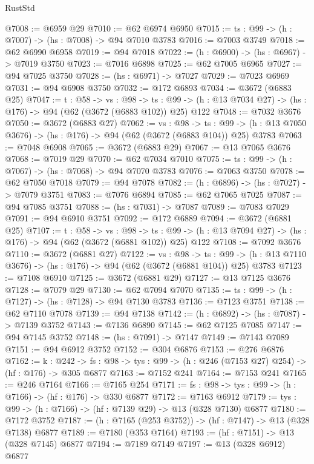 \begin{lexlean}{RustStd}
\begin{coremodule}
{\begin{coremodule}
{{{{{{{{{@7008 := @6959 @29
@7010 := @62 @6974 @6950
@7015 := {ts : @99} -> (h : @7007) -> (hs : @7008) -> @94 @7010 @3783
@7016 := @7003 @3749
@7018 := @62 @6990 @6958
@7019 := @94 @7018
@7022 := (h : @6900) -> (hs : @6967) -> @7019 @3750
@7023 := @7016 @6898
@7025 := @62 @7005 @6965
@7027 := @94 @7025 @3750
@7028 := (hs : @6971) -> @7027
@7029 := @7023 @6969
@7031 := @94 @6908 @3750
@7032 := @172 @6893
@7034 := @3672 (@6883 @25)
@7047 := {t : @58} ->
  {vs : @98} ->
  {ts : @99} -> (h : @13 @7034 @27) -> (hs : @176) -> @94 (@62 (@3672 (@6883 @102)) @25) @122
@7048 := @7032 @3676
@7050 := @3672 (@6883 @27)
@7062 := {vs : @98} ->
  {ts : @99} -> (h : @13 @7050 @3676) -> (hs : @176) -> @94 (@62 (@3672 (@6883 @104)) @25) @3783
@7063 := @7048 @6908
@7065 := @3672 (@6883 @29)
@7067 := @13 @7065 @3676
@7068 := @7019 @29
@7070 := @62 @7034 @7010
@7075 := {ts : @99} -> (h : @7067) -> (hs : @7068) -> @94 @7070 @3783
@7076 := @7063 @3750
@7078 := @62 @7050 @7018
@7079 := @94 @7078
@7082 := (h : @6896) -> (hs : @7027) -> @7079 @3751
@7083 := @7076 @6894
@7085 := @62 @7065 @7025
@7087 := @94 @7085 @3751
@7088 := (hs : @7031) -> @7087
@7089 := @7083 @7029
@7091 := @94 @6910 @3751
@7092 := @172 @6889
@7094 := @3672 (@6881 @25)
@7107 := {t : @58} ->
  {vs : @98} ->
  {ts : @99} -> (h : @13 @7094 @27) -> (hs : @176) -> @94 (@62 (@3672 (@6881 @102)) @25) @122
@7108 := @7092 @3676
@7110 := @3672 (@6881 @27)
@7122 := {vs : @98} ->
  {ts : @99} -> (h : @13 @7110 @3676) -> (hs : @176) -> @94 (@62 (@3672 (@6881 @104)) @25) @3783
@7123 := @7108 @6910
@7125 := @3672 (@6881 @29)
@7127 := @13 @7125 @3676
@7128 := @7079 @29
@7130 := @62 @7094 @7070
@7135 := {ts : @99} -> (h : @7127) -> (hs : @7128) -> @94 @7130 @3783
@7136 := @7123 @3751
@7138 := @62 @7110 @7078
@7139 := @94 @7138
@7142 := (h : @6892) -> (hs : @7087) -> @7139 @3752
@7143 := @7136 @6890
@7145 := @62 @7125 @7085
@7147 := @94 @7145 @3752
@7148 := (hs : @7091) -> @7147
@7149 := @7143 @7089
@7151 := @94 @6912 @3752
@7152 := @304 @6876
@7153 := @276 @6876
@7162 := {k : @242} ->
  {fs : @98} -> {tys : @99} -> (h : @246 (@7153 @27) @254) -> (hf : @176) -> @305 @6877
@7163 := @7152 @241
@7164 := @7153 @241
@7165 := @246 @7164
@7166 := @7165 @254
@7171 := {fs : @98} -> {tys : @99} -> (h : @7166) -> (hf : @176) -> @330 @6877
@7172 := @7163 @6912
@7179 := {tys : @99} -> (h : @7166) -> (hf : @7139 @29) -> @13 (@328 @7130) @6877
@7180 := @7172 @3752
@7187 := (h : @7165 (@253 @3752)) -> (hf : @7147) -> @13 (@328 @7138) @6877
@7189 := @7180 (@353 @7164)
@7193 := (hf : @7151) -> @13 (@328 @7145) @6877
@7194 := @7189 @7149
@7197 := @13 (@328 @6912) @6877
}}}}}}}}}
\end{coremodule}}
\end{coremodule}
\end{lexlean}
